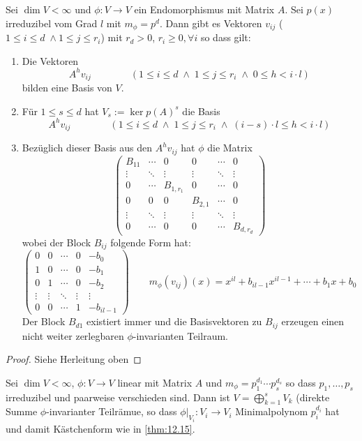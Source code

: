 \documentclass[a4paper, 10pt]{scrbook}
\begin{document}
\begin{thm}
	\label{thm:12.15}
	Sei $\dim V<\infty$ und $\phi: V\to V$ ein Endomorphismus mit Matrix $A$.
	Sei $p(x)$ irreduzibel vom Grad $l$ mit $m_\phi = p^d$.
	Dann gibt es Vektoren $v_{ij}$ ($1\le i \le d \;\land 1\le j \le r_i$) mit $r_d >0$, $r_i\ge 0, \forall i$ so dass gilt:
	\begin{enumerate}[(1)]
		\item
			Die Vektoren
			\[
				A^h v_{ij} \qquad\qquad  (1\le i \le d \;\land\; 1\le j \le r_i \;\land\;  0\le h<i\cdot l)
			\]
			bilden eine Basis von $V$.
		\item
			Für $1\le s\le d$ hat $V_s := \ker p(A)^s$ die Basis 
			\[
				A^hv_{ij} \qquad\qquad (1\le i\le d \;\land\; 1\le j \le r_i \;\land\; (i-s)\cdot l \le h < i\cdot l)
			\]
		\item
			Bezüglich dieser Basis aus den $A^hv_{ij}$ hat $\phi$ die Matrix
			\[
				\begin{pmatrix}
					B_{11} & \cdots &0 & 0 & \cdots & 0\\
					\vdots & \ddots &\vdots &  \vdots & \ddots & \vdots\\
					0 & \cdots & B_{1,r_1} & 0 & \cdots & 0\\
					0 & 0 & 0 & B_{2,1} &\cdots & 0\\
					\vdots & \ddots & \vdots & \vdots & \ddots & \vdots \\
					0 & \cdots & 0 & 0 & \cdots & B_{d,r_d}
				\end{pmatrix}
			\]
			wobei der Block $B_{ij}$ folgende Form hat:
			\[
				\begin{pmatrix}
					0 & 0 & \cdots & 0 & -b_0 \\
					1& 0 &\cdots & 0 & -b_1 \\
					0& 1 & \cdots & 0 & -b_2 \\
					\vdots & \vdots & \ddots & \vdots & \vdots \\
					0 & 0& \cdots & 1 &  -b_{il-1}
				\end{pmatrix}
				\qquad
				m_\phi(v_{ij})(x) = x^{il} + b_{il-1}x^{il-1} + \dotsb + b_1x + b_0
			\]
			Der Block $B_{d1}$ existiert immer und die Basisvektoren zu $B_{ij}$ erzeugen einen nicht weiter zerlegbaren $\phi$-invarianten Teilraum.
	\end{enumerate}
	\begin{proof}
		Siehe Herleitung oben
	\end{proof}
\end{thm}

\begin{thm}
	\label{thm:12.16}
	Sei $\dim V<\infty$, $\phi:V\to V$ linear mit Matrix $A$ und $m_\phi = p_1^{d_1}\dotsb p_s^{d_s}$ so dass $p_1,\dotsc, p_s$ irreduzibel und paarweise verschieden sind.
	Dann ist $V = \bigoplus_{k=1}^s V_k$ (direkte Summe $\phi$-invarianter Teilrämue, so dass $\phi\big|_{V_i} : V_i \to V_i$ Minimalpolynom $p_i^{d_i}$ hat und damit Kästchenform wie in \ref{thm:12.15}.
\end{thm}
\end{document}
